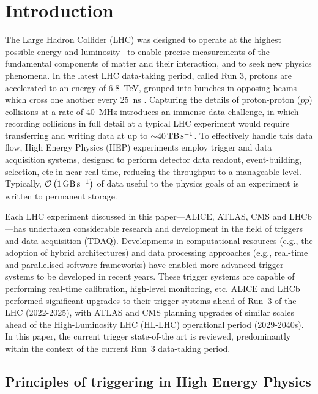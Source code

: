 \section{Introduction}


The Large Hadron Collider (LHC) was designed to operate at the highest possible energy and luminosity~\cite{CERN:lhc-design-report} to enable precise measurements of the fundamental components of matter and their interaction, and to seek new physics phenomena. 
In the latest LHC data-taking period, called Run 3, protons are accelerated to an energy of \SI{6.8}{\tera\electronvolt}, grouped into bunches in opposing beams which cross one another every \SI{25}{\nano\second} \cite{CERN:lhc-run3-operation}. 
Capturing the details of proton-proton ($pp$) collisions at a rate of \SI{40}{\mega\hertz} introduces an immense data challenge, in which recording collisions in full detail at a typical LHC experiment would require transferring and writing data at up to ${\sim}\SI{40}{\tera\byte\per\second}$. 
To effectively handle this data flow, High Energy Physics (HEP) experiments employ trigger and data acquisition systems, designed to perform detector data readout, event-building, selection, etc in near-real time, reducing the throughput to a manageable level. Typically, $\mathcal{O}\left(\SI{1}{\giga\byte\per\second}\right)$ of data useful to the physics goals of an experiment is written to permanent storage.

Each LHC experiment discussed in this paper—ALICE, ATLAS, CMS and LHCb—has undertaken considerable research and development in the field of triggers and data acquisition (TDAQ). Developments in computational resources (e.g., the adoption of hybrid architectures) and data processing approaches (e.g., real-time and parallelised software frameworks) have enabled more advanced trigger systems to be developed in recent years. These trigger systems are capable of performing real-time calibration, high-level monitoring, etc. ALICE and LHCb performed significant upgrades to their trigger systems ahead of Run~3 of the LHC (2022-2025), with ATLAS and CMS planning upgrades of similar scales ahead of the High-Luminosity LHC (HL-LHC) operational period (2029-2040s). In this paper, the current trigger state-of-the art is reviewed, predominantly within the context of the current Run~3 data-taking period.

\subsection{Principles of triggering in High Energy Physics}

